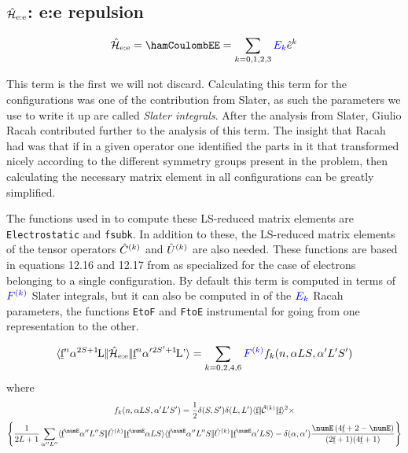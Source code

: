 \documentclass{article}
\newcommand{\codetext}[1]{{\color{BlueViolet} \texttt{#1}}}
\begin{document}
\subsection{$\hat{\mathcal{H}}_\text{e:e}$: e:e repulsion}
 
    \begin{equation}
        \hamCoulombEESymbol = \hamCoulombEE = \sum_{k=0,1,2,3} \Ek \hat{e}^k 
    \end{equation}  

    This term is the first we will not discard. Calculating this term for the \fn configurations was one of the contribution from Slater, as such the parameters we use to write it up are called \textit{Slater integrals}. After the analysis from Slater, Giulio Racah contributed further to the analysis of this term. The insight that Racah had was that if in a given operator one identified the parts in it that transformed nicely according to the different symmetry groups present in the problem, then calculating the necessary matrix element in all \fn configurations can   be greatly simplified.

    The functions used in \ql to compute these LS-reduced matrix elements are \codetext{Electrostatic} and \codetext{fsubk}. In addition to these, the LS-reduced matrix elements of the tensor operators $\hat{C}^{(k)}$ and $\hat{U}^{(k)}$ are also needed. These functions are based in equations 12.16 and 12.17 from \cite{cowan_theory_1981} as specialized for the case of electrons belonging to a single \fn configuration. By default this term is computed in terms of $\textcolor{blue}{{F^{(k)}}}$ Slater integrals, but it can also be computed in of the $\textcolor{blue}{{E_{k}}}$ Racah parameters, the functions \codetext{EtoF} and \codetext{FtoE} instrumental for going from one representation to the other.
    
    \begin{equation}
    \langle \underbar{$\text{f}$}^n\alpha{}^{2S+1}{\kern-0.1em}{\text{L}}|\!|\hat{\mathcal{H}}_\text{e:e}|\!|\underbar{$\text{f}$}^n\alpha'{}^{2S'+1}{\kern-0.1em}{\text{L'}}\rangle = \sum_{k=0,2,4,6} \textcolor{blue}{{F^{(k)}}} f_k(n,\alpha{LS},\alpha'{L'S'})
    \end{equation} 
    where
    \begin{multline}
        f_k(n,\alpha{LS},\alpha'{L'S'}) = \frac{1}{2} 
            \kronecker{S}{S'}
            \kronecker{L}{L'}
            \redbraopket{\forb}
                {\op{\mathcal{C}}^{(k)}}
                {\forb}^2 \times \\
            \left\{ 
                \frac{1}{\tpo{L}} \sum_{\alpha''L''} 
                    \redbraopket{\forb^\numE \alpha'' L'' S}
                        {\op{U}^{(k)}}
                        {\forb^\numE \alpha L S} 
                \redbraopket{\forb^\numE \alpha'' L'' S}
                    {\op{U}^{(k)}} 
                    {\forb^\numE \alpha' L S}
                - \kronecker{\alpha}{\alpha'}
                    \frac{\numE \left(4 \forb + 2 - \numE\right)}
                        {(\tpo{\forb})(4 \forb + 1)} 
            \right\}
    \end{multline}       
\end{document}
